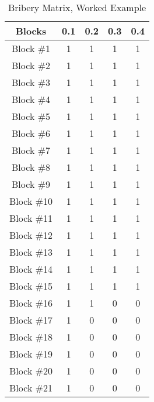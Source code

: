 \begin{table}[ht]
\caption{Bribery Matrix, Worked Example} 
\centering
\begin{tabular}{|c| c c c c|} 
 \hline
 Blocks & 0.1 & 0.2 & 0.3 & 0.4 \\
 \hline
 Block \#1 & 1 &  1 &  1 &  1 \\
 \hline
 Block \#2 & 1 &  1 &  1 &  1 \\
 \hline
 Block \#3 & 1 &  1 &  1 &  1 \\
 \hline
 Block \#4 & 1 &  1 &  1 &  1 \\
 \hline
 Block \#5 & 1 &  1 &  1 &  1 \\
 \hline
 Block \#6 & 1 &  1 &  1 &  1 \\
 \hline
 Block \#7 & 1 &  1 &  1 &  1 \\
 \hline
 Block \#8 & 1 &  1 &  1 &  1 \\
 \hline
 Block \#9 & 1 &  1 &  1 &  1 \\
 \hline
 Block \#10 & 1 &  1 &  1 &  1 \\
 \hline
 Block \#11 & 1 &  1 &  1 &  1 \\
 \hline
 Block \#12 & 1 &  1 &  1 &  1 \\
 \hline
 Block \#13 & 1 &  1 &  1 &  1 \\
 \hline
 Block \#14 & 1 &  1 &  1 &  1 \\
 \hline
  Block \#15 & 1 &  1 &  1 &  1 \\
 \hline
 Block \#16 & 1 &  1 &  0 &  0 \\
 \hline
 Block \#17 & 1 &  0 &  0 &  0 \\
 \hline
 Block \#18 & 1 &  0 &  0 &  0 \\
 \hline
 Block \#19 & 1 &  0 &  0 &  0 \\
 \hline
 Block \#20 & 1 &  0 &  0 &  0 \\
 \hline
 Block \#21 & 1 &  0 &  0 &  0 \\ 
 \hline
 \end{tabular}
\label{table:bribery_matrix}
\end{table}

